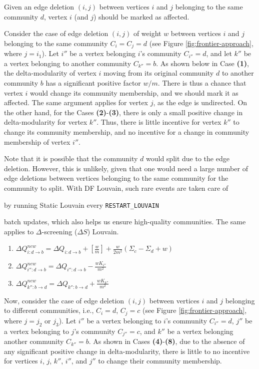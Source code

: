\begin{lemma}
\label{thm:louvain--mark-deletion}
Given an edge deletion $(i, j)$ between vertices $i$ and $j$ belonging to the same community $d$, vertex $i$ (and $j$) should be marked as affected.
\end{lemma}

Consider the case of edge deletion $(i, j)$ of weight $w$ between vertices $i$ and $j$ belonging to the same community $C_i = C_j = d$ (see Figure \ref{fig:frontier-approach}, where $j = i_1$). Let $i''$ be a vertex belonging $i$'s community $C_{i''} = d$, and let $k''$ be a vertex belonging to another community $C_{k''} = b$. As shown below in Case \textbf{(1)}, the delta-modularity of vertex $i$ moving from its original community $d$ to another community $b$ has a significant positive factor $w/m$. There is thus a chance that vertex $i$ would change its community membership, and we should mark it as affected. The same argument applies for vertex $j$, as the edge is undirected. On the other hand, for the Cases \textbf{(2)}-\textbf{(3)}, there is only a small positive change in delta-modularity for vertex $k''$. Thus, there is little incentive for vertex $k''$ to change its community membership, and no incentive for a change in community membership of vertex $i''$.

Note that it is possible that the community $d$ would split due to the edge deletion. However, this is unlikely, given that one would need a large number of edge deletions between vertices belonging to the same community for the community to split. With DF Louvain, such rare events are taken care of by running Static Louvain every \verb|RESTART_LOUVAIN| batch updates, which also helps us ensure high-quality communities. The same applies to $\Delta$-screening ($\Delta S$) Louvain.

\begin{enumerate}
  \item $\Delta Q_{i:d \rightarrow b}^{new} = \Delta Q_{i:d \rightarrow b} + [\frac{w}{m}] + \frac{w}{2m^2} (\Sigma_c - \Sigma_d + w)$
  \item $\Delta Q_{i'':d \rightarrow b}^{new} = \Delta Q_{i'':d \rightarrow b} - \frac{wK_{i''}}{m^2}$
  \item $\Delta Q_{k'':b \rightarrow d}^{new} = \Delta Q_{k'':b \rightarrow d} + \frac{wK_{k''}}{m^2}$
\end{enumerate}

Now, consider the case of edge deletion $(i, j)$ between vertices $i$ and $j$ belonging to different communities, i.e., $C_i = d$, $C_j = c$ (see Figure \ref{fig:frontier-approach}, where $j = j_2$ or $j_3$). Let $i''$ be a vertex belonging to $i$'s community $C_{i''} = d$, $j''$ be a vertex belonging to $j$'s community $C_{j''} = c$, and $k''$ be a vertex belonging another community $C_{k''} = b$. As shown in Cases \textbf{(4)}-\textbf{(8)}, due to the absence of any significant positive change in delta-modularity, there is little to no incentive for vertices $i$, $j$, $k''$, $i''$, and $j''$ to change their community membership.

